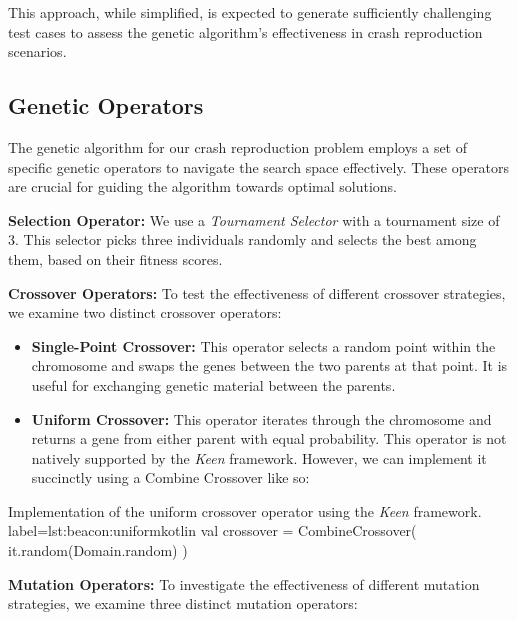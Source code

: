         This approach, while simplified, is expected to generate sufficiently challenging test cases to assess the 
        genetic algorithm's effectiveness in crash reproduction scenarios.

    \subsection{Genetic Operators}
        The genetic algorithm for our crash reproduction problem employs a set of specific genetic operators to navigate 
        the search space effectively. These operators are crucial for guiding the algorithm towards optimal solutions.
    
        \textbf{Selection Operator:} We use a \textit{Tournament Selector} with a tournament size of 3. This selector 
        picks three individuals randomly and selects the best among them, based on their fitness scores.
    
        \textbf{Crossover Operators:} To test the effectiveness of different crossover strategies, we examine two
        distinct crossover operators:

        \begin{itemize}
            \item \textbf{Single-Point Crossover:} This operator selects a random point within the chromosome and 
                swaps the genes between the two parents at that point. It is useful for exchanging genetic material 
                between the parents.
            \item \textbf{Uniform Crossover:} This operator iterates through the chromosome and returns a gene from 
                either parent with equal probability. This operator is not natively supported by the \textit{Keen}
                framework. However, we can implement it succinctly using a Combine Crossover like so:
        \end{itemize}

        \begin{code}{%
            Implementation of the uniform crossover operator using the \textit{Keen} framework.
        }{label=lst:beacon:uniform}{kotlin}
            val crossover = CombineCrossover({ it.random(Domain.random) })
        \end{code}
    
        \textbf{Mutation Operators:} To investigate the effectiveness of different mutation strategies, we examine three
        distinct mutation operators:
    
